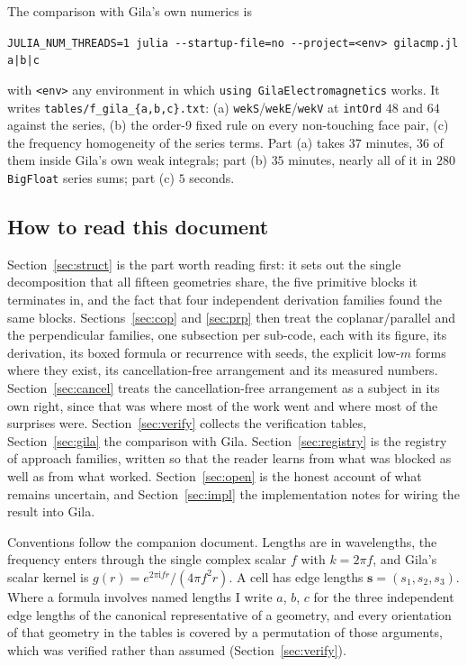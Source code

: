 \documentclass[11pt]{article}
\theoremstyle{remark}
\newcommand{\ii}{\mathrm{i}}
\newcommand{\code}[1]{\texttt{#1}}
\begin{document}
The comparison with Gila's own numerics is
\begin{center}\small
\code{JULIA\_NUM\_THREADS=1 julia -{}-startup-file=no -{}-project=<env> gilacmp.jl a|b|c}
\end{center}
with \code{<env>} any environment in which \code{using GilaElectromagnetics} works. It
writes \code{tables/f\_gila\_\{a,b,c\}.txt}: (a) \code{wekS}/\code{wekE}/\code{wekV} at
\code{intOrd} $48$ and $64$ against the series, (b) the order-9 fixed rule on every
non-touching face pair, (c) the frequency homogeneity of the series terms. Part (a) takes
$37$ minutes, $36$ of them inside Gila's own weak integrals; part (b) $35$ minutes, nearly
all of it in $280$ \code{BigFloat} series sums; part (c) $5$ seconds.

\subsection{How to read this document}

Section~\ref{sec:struct} is the part worth reading first: it sets out the single
decomposition that all fifteen geometries share, the five primitive blocks it terminates
in, and the fact that four independent derivation families found the same blocks.
Sections~\ref{sec:cop} and \ref{sec:prp} then treat the coplanar/parallel and the
perpendicular families, one subsection per sub-code, each with its figure, its derivation,
its boxed formula or recurrence with seeds, the explicit low-$m$ forms where they exist,
its cancellation-free arrangement and its measured numbers. Section~\ref{sec:cancel}
treats the cancellation-free arrangement as a subject in its own right, since that was
where most of the work went and where most of the surprises were.
Section~\ref{sec:verify} collects the verification tables, Section~\ref{sec:gila} the
comparison with Gila. Section~\ref{sec:registry} is the registry of approach families,
written so that the reader learns from what was blocked as well as from what worked.
Section~\ref{sec:open} is the honest account of what remains uncertain, and
Section~\ref{sec:impl} the implementation notes for wiring the result into Gila.

Conventions follow the companion document. Lengths are in wavelengths, the frequency
enters through the single complex scalar $f$ with $k = 2\pi f$, and Gila's scalar kernel is
$g(r) = e^{2\pi\ii f r}/(4\pi f^2 r)$. A cell has edge lengths $\mathbf{s} = (s_1,s_2,s_3)$.
Where a formula involves named lengths I write $a$, $b$, $c$ for the three independent
edge lengths of the canonical representative of a geometry, and every orientation of that
geometry in the tables is covered by a permutation of those arguments, which was verified
rather than assumed (Section~\ref{sec:verify}).
\end{document}
